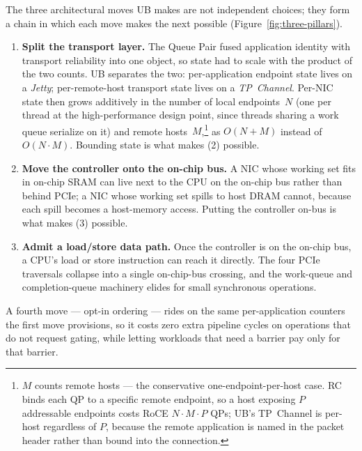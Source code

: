 \documentclass[10pt,twocolumn]{article}
\begin{document}
The three architectural moves UB makes are not independent
choices; they form a chain in which each move makes the next
possible (Figure~\ref{fig:three-pillars}).

\begin{enumerate}\itemsep 3pt

\item \textbf{Split the transport layer.} The Queue Pair fused
application identity with transport reliability into one object,
so state had to scale with the product of the two counts. UB
separates the two: per-application endpoint state lives on a
\emph{Jetty}; per-remote-host transport state lives on a
\emph{TP~Channel}. Per-NIC state then grows additively in the
number of local endpoints~$N$ (one per thread at the
high-performance design point, since threads sharing a work queue
serialize on it) and remote hosts~$M$,\footnote{$M$ counts remote
hosts --- the conservative one-endpoint-per-host case. RC binds
each QP to a specific remote endpoint, so a host exposing $P$
addressable endpoints costs RoCE $N{\cdot}M{\cdot}P$ QPs; UB's
TP~Channel is per-host regardless of $P$, because the remote
application is named in the packet header rather than bound into
the connection.} as $O(N{+}M)$ instead of $O(N{\cdot}M)$. Bounding
state is what makes (2) possible.

\item \textbf{Move the controller onto the on-chip bus.} A NIC
whose working set fits in on-chip SRAM can live next to the CPU
on the on-chip bus rather than behind PCIe; a NIC whose working
set spills to host DRAM cannot, because each spill becomes a
host-memory access. Putting the controller on-bus is what makes
(3) possible.

\item \textbf{Admit a load/store data path.} Once the controller
is on the on-chip bus, a CPU's load or store instruction can
reach it directly. The four PCIe traversals collapse into a
single on-chip-bus crossing, and the work-queue and
completion-queue machinery elides for small synchronous
operations.

\end{enumerate}

\noindent A fourth move --- opt-in ordering --- rides on the same
per-application counters the first move provisions, so it costs
zero extra pipeline cycles on operations that do not request
gating, while letting workloads that need a barrier pay only for
that barrier.
\end{document}
